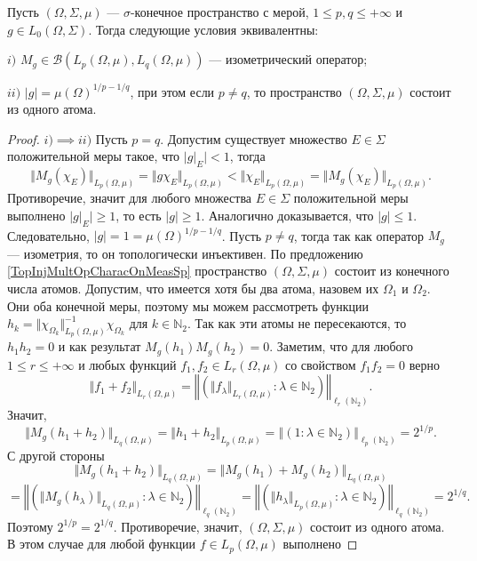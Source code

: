 \begin{proposition}\label{IsomMultOpCharacOnMeasSp} Пусть $(\Omega,\Sigma,\mu)$ --- $\sigma$-конечное пространство с мерой, $1\leq p,q\leq +\infty$ и $g\in L_0(\Omega,\Sigma)$. Тогда следующие условия эквивалентны:

$i)$ $M_g\in\mathcal{B}(L_p(\Omega,\mu),L_q(\Omega,\mu))$ --- изометрический оператор;

$ii)$ $|g|=\mu(\Omega)^{1/p-1/q}$, при этом если $p\neq q$, то пространство $(\Omega,\Sigma,\mu)$ состоит из одного атома.

\end{proposition}
\begin{proof} $i)$$\implies$$ ii)$ Пусть $p=q$. Допустим существует множество $E\in\Sigma$ положительной меры такое, что $|g|_E|<1$, тогда
$$
\Vert M_g(\chi_E)\Vert_{L_p(\Omega,\mu)}
=\Vert g \chi_E\Vert_{L_p(\Omega,\mu)}
<\Vert\chi_E\Vert_{L_p(\Omega,\mu)}
=\Vert M_g(\chi_E)\Vert_{L_p(\Omega,\mu)}.
$$
Противоречие, значит для любого множества  $E\in\Sigma$ положительной меры выполнено $|g|_E|\geq 1$, то есть $|g|\geq 1$. Аналогично доказывается, что $|g|\leq 1$. Следовательно, $|g|=1=\mu(\Omega)^{1/p-1/q}$. Пусть $p\neq q$, тогда так как оператор $M_g$ --- изометрия, то он топологически инъективен. По предложению \ref{TopInjMultOpCharacOnMeasSp} пространство $(\Omega,\Sigma,\mu)$ состоит из конечного числа атомов. Допустим, что имеется хотя бы два атома, назовем их $\Omega_1$ и $\Omega_2$. Они оба конечной меры, поэтому мы можем рассмотреть функции $h_k=\Vert\chi_{\Omega_k}\Vert_{L_p(\Omega,\mu)}^{-1}\chi_{\Omega_k}$ для $k\in\mathbb{N}_2$. Так как эти атомы не пересекаются, то $h_1h_2=0$ и как результат $M_g(h_1)M_g(h_2)=0$. Заметим, что для любого $1\leq r\leq +\infty$ и любых функций $f_1,f_2\in L_r(\Omega,\mu)$ со свойством $f_1f_2=0$ верно
$$
\Vert f_1+f_2\Vert_{L_r(\Omega,\mu)}
=\left\Vert\left(\Vert f_\lambda\Vert_{L_r(\Omega,\mu)}:\lambda\in\mathbb{N}_2\right)\right\Vert_{\ell_r(\mathbb{N}_2)}.
$$
Значит,
$$
\Vert M_g(h_1+h_2)\Vert_{L_q(\Omega,\mu)}
=\Vert h_1+h_2\Vert_{L_p(\Omega,\mu)}
=\left\Vert\left( 1 :\lambda\in\mathbb{N}_2\right)\right\Vert_{\ell_p(\mathbb{N}_2)}
=2^{1/p}.
$$
С другой стороны
$$
\Vert M_g(h_1+h_2)\Vert_{L_q(\Omega,\mu)}
=\Vert M_g(h_1)+M_g(h_2)\Vert_{L_q(\Omega,\mu)}
$$
$$
=\left\Vert\left(\Vert M_g(h_\lambda)\Vert_{L_q(\Omega,\mu)}:\lambda\in\mathbb{N}_2\right)\right\Vert_{\ell_q(\mathbb{N}_2)}
=\left\Vert\left(\Vert h_\lambda\Vert_{L_p(\Omega,\mu)}:\lambda\in\mathbb{N}_2\right)\right\Vert_{\ell_q(\mathbb{N}_2)}
=2^{1/q}.
$$
Поэтому $2^{1/p}=2^{1/q}$. Противоречие, значит, $(\Omega,\Sigma,\mu)$ состоит из одного атома. В этом случае для любой функции $f\in L_p(\Omega,\mu)$ выполнено

\end{proof}
